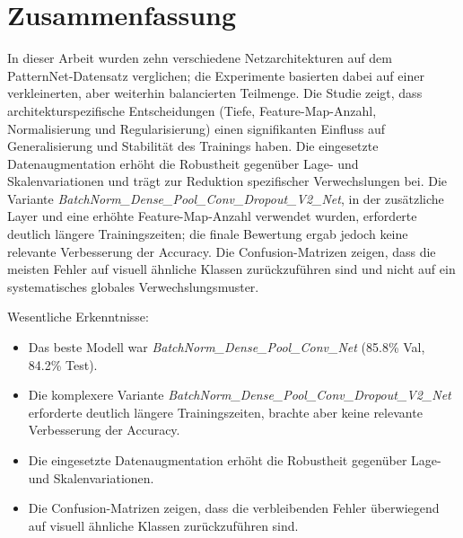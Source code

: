 \section{Zusammenfassung}
\label{sec:fazit}

In dieser Arbeit wurden zehn verschiedene Netzarchitekturen auf dem
PatternNet-Datensatz verglichen; die Experimente basierten dabei auf einer
verkleinerten, aber weiterhin balancierten Teilmenge.
Die Studie zeigt, dass architekturspezifische Entscheidungen (Tiefe,
Feature-Map-Anzahl, Normalisierung und Regularisierung) einen signifikanten
Einfluss auf Generalisierung und Stabilität des Trainings haben.
Die eingesetzte Datenaugmentation erhöht die Robustheit
gegenüber Lage- und Skalenvariationen und trägt zur Reduktion spezifischer
Verwechslungen bei. Die Variante \emph{BatchNorm\_Dense\_Pool\_Conv\_Dropout\_V2\_Net},
in der zusätzliche Layer und eine erhöhte Feature-Map-Anzahl verwendet wurden,
erforderte deutlich längere Trainingszeiten; die finale Bewertung ergab jedoch
keine relevante Verbesserung der Accuracy. Die Confusion-Matrizen zeigen, dass
die meisten Fehler auf visuell ähnliche Klassen zurückzuführen sind und nicht auf
ein systematisches globales Verwechslungsmuster.

Wesentliche Erkenntnisse:
\begin{itemize}
      \item Das beste Modell war \emph{BatchNorm\_Dense\_Pool\_Conv\_Net} (85.8\% Val, 84.2\% Test).
      \item Die komplexere Variante \emph{BatchNorm\_Dense\_Pool\_Conv\_Dropout\_V2\_Net} erforderte
            deutlich längere Trainingszeiten, brachte aber keine relevante Verbesserung der Accuracy.
      \item Die eingesetzte Datenaugmentation erhöht die Robustheit gegenüber Lage- und Skalenvariationen.
      \item Die Confusion-Matrizen zeigen, dass die verbleibenden Fehler überwiegend auf visuell
            ähnliche Klassen zurückzuführen sind.
\end{itemize}
